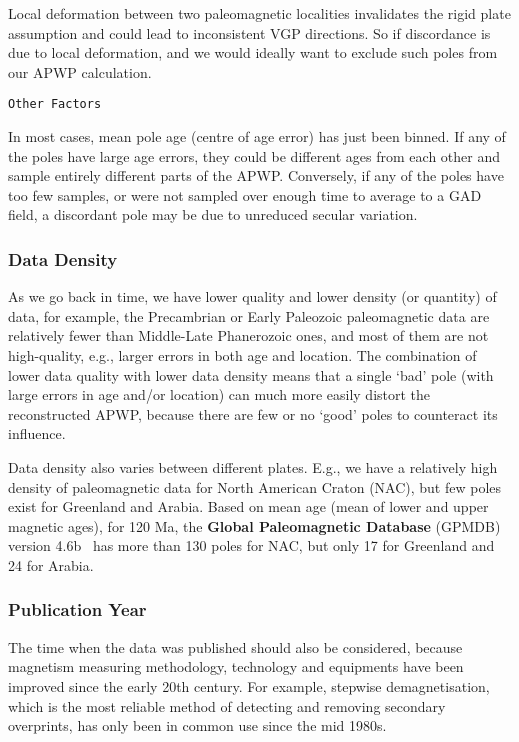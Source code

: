 Local deformation between two paleomagnetic localities invalidates the rigid
plate assumption and could lead to inconsistent VGP directions. So if
discordance is due to local deformation, and we would ideally want to exclude
such poles from our APWP calculation.

\verb"Other Factors"

In most cases, mean pole age (centre of age error) has just been binned. If
any of the poles have large age errors, they could be different ages from each
other and sample entirely different parts of the APWP\@. Conversely, if any of
the poles have too few samples, or were not sampled over enough time to average
to a GAD field, a discordant pole may be due to unreduced secular variation.

\subsubsection{Data Density}

As we go back in time, we have lower quality and lower density (or quantity) of
data, for example, the Precambrian or Early Paleozoic paleomagnetic data are
relatively fewer than Middle-Late Phanerozoic ones, and most of them are not
high-quality, e.g., larger errors in both age and location. The combination of
lower data quality with lower data density means that a single `bad' pole (with
large errors in age and/or location) can much more easily distort the
reconstructed APWP, because there are few or no `good' poles to counteract its
influence.

Data density also varies between different plates. E.g., we have a relatively
high density of paleomagnetic data for North American Craton (NAC), but few
poles exist for Greenland and Arabia. Based on mean age (mean of lower and upper
magnetic ages), for 120 Ma, the \textbf{Global Paleomagnetic
Database} (GPMDB) version 4.6b~\cite{P05} has more than 130 poles for NAC, but
only 17 for Greenland and 24 for Arabia.

\subsubsection{Publication Year}

The time when the data was published should also be considered, because
magnetism measuring methodology, technology and equipments have been improved
since the early 20th century. For example, stepwise demagnetisation, which is
the most reliable method of detecting and removing secondary overprints, has
only been in common use since the mid 1980s.

